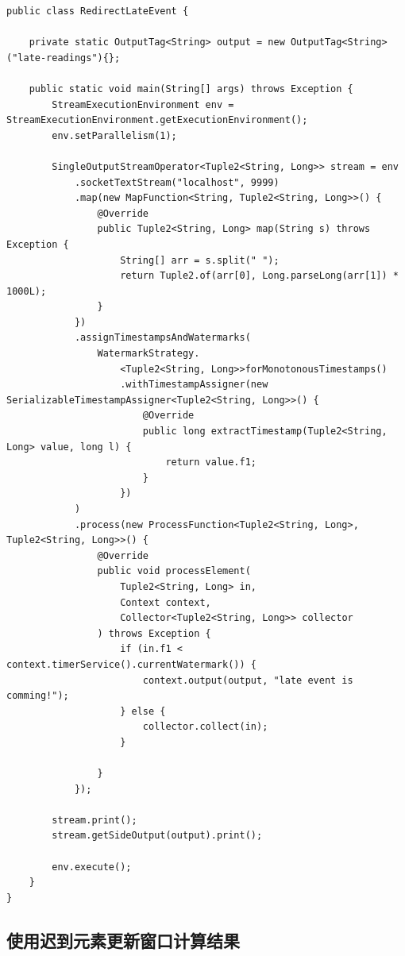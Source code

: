 \documentclass[cn,11pt,chinese]{elegantbook}
\begin{document}
\begin{verbatim}
public class RedirectLateEvent {

    private static OutputTag<String> output = new OutputTag<String>("late-readings"){};

    public static void main(String[] args) throws Exception {
        StreamExecutionEnvironment env = StreamExecutionEnvironment.getExecutionEnvironment();
        env.setParallelism(1);

        SingleOutputStreamOperator<Tuple2<String, Long>> stream = env
            .socketTextStream("localhost", 9999)
            .map(new MapFunction<String, Tuple2<String, Long>>() {
                @Override
                public Tuple2<String, Long> map(String s) throws Exception {
                    String[] arr = s.split(" ");
                    return Tuple2.of(arr[0], Long.parseLong(arr[1]) * 1000L);
                }
            })
            .assignTimestampsAndWatermarks(
                WatermarkStrategy.
                    <Tuple2<String, Long>>forMonotonousTimestamps()
                    .withTimestampAssigner(new SerializableTimestampAssigner<Tuple2<String, Long>>() {
                        @Override
                        public long extractTimestamp(Tuple2<String, Long> value, long l) {
                            return value.f1;
                        }
                    })
            )
            .process(new ProcessFunction<Tuple2<String, Long>, Tuple2<String, Long>>() {
                @Override
                public void processElement(
                    Tuple2<String, Long> in,
                    Context context,
                    Collector<Tuple2<String, Long>> collector
                ) throws Exception {
                    if (in.f1 < context.timerService().currentWatermark()) {
                        context.output(output, "late event is comming!");
                    } else {
                        collector.collect(in);
                    }

                }
            });

        stream.print();
        stream.getSideOutput(output).print();

        env.execute();
    }
}
\end{verbatim}

\subsection{使用迟到元素更新窗口计算结果}
\end{document}
